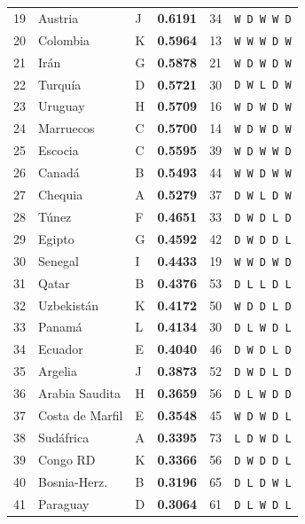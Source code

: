 \documentclass[11pt,a4paper]{article}
\begin{document}
\begin{center}
\begin{longtable}{@{}rllccc@{}}
  19 & Austria & J & \textbf{0.6191} & 34 & \texttt{W D W W D} \\
  \rowcolor{tablerow}20 & Colombia & K & \textbf{0.5964} & 13 & \texttt{W W W D W} \\
  21 & Irán & G & \textbf{0.5878} & 21 & \texttt{W D W D W} \\
  \rowcolor{tablerow}22 & Turquía & D & \textbf{0.5721} & 30 & \texttt{D W L D W} \\
  23 & Uruguay & H & \textbf{0.5709} & 16 & \texttt{W D W D W} \\
  \rowcolor{tablerow}24 & Marruecos & C & \textbf{0.5700} & 14 & \texttt{W D W D W} \\
  25 & Escocia & C & \textbf{0.5595} & 39 & \texttt{W D W W D} \\
  \rowcolor{tablerow}26 & Canadá & B & \textbf{0.5493} & 44 & \texttt{W W D W W} \\
  27 & Chequia & A & \textbf{0.5279} & 37 & \texttt{D W L D W} \\
  \rowcolor{tablerow}28 & Túnez & F & \textbf{0.4651} & 33 & \texttt{D W D L D} \\
  29 & Egipto & G & \textbf{0.4592} & 42 & \texttt{D W D D L} \\
  \rowcolor{tablerow}30 & Senegal & I & \textbf{0.4433} & 19 & \texttt{W W D W D} \\
  31 & Qatar & B & \textbf{0.4376} & 53 & \texttt{D L L D L} \\
  \rowcolor{tablerow}32 & Uzbekistán & K & \textbf{0.4172} & 50 & \texttt{W D D L D} \\
  33 & Panamá & L & \textbf{0.4134} & 30 & \texttt{D L W D L} \\
  \rowcolor{tablerow}34 & Ecuador & E & \textbf{0.4040} & 46 & \texttt{D W D L D} \\
  35 & Argelia & J & \textbf{0.3873} & 52 & \texttt{D W D L D} \\
  \rowcolor{tablerow}36 & Arabia Saudita & H & \textbf{0.3659} & 56 & \texttt{D L W D D} \\
  37 & Costa de Marfil & E & \textbf{0.3548} & 45 & \texttt{W D W D L} \\
  \rowcolor{tablerow}38 & Sudáfrica & A & \textbf{0.3395} & 73 & \texttt{L D W D L} \\
  39 & Congo RD & K & \textbf{0.3366} & 56 & \texttt{D W D D L} \\
  \rowcolor{tablerow}40 & Bosnia-Herz. & B & \textbf{0.3196} & 65 & \texttt{D L D W L} \\
  41 & Paraguay & D & \textbf{0.3064} & 61 & \texttt{D L W D L} \\

\end{longtable}
\end{center}
\end{document}
